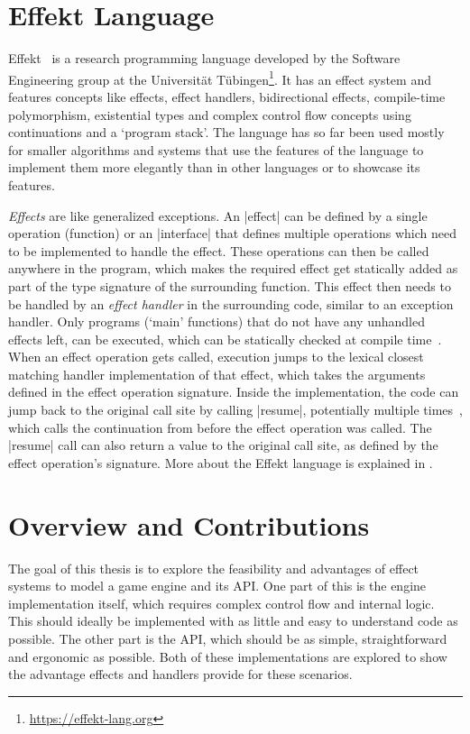 \section*{Effekt Language}

Effekt~\cite{brachthauser2020effects} is a research programming language developed by the Software Engineering group at the Universität Tübingen\footnote{\url{https://effekt-lang.org}}. It has an effect system and features concepts like effects, effect handlers, bidirectional effects, compile-time polymorphism, existential types and complex control flow concepts using continuations and a `program stack'. The language has so far been used mostly for smaller algorithms and systems that use the features of the language to implement them more elegantly than in other languages or to showcase its features.

\textit{Effects} are like generalized exceptions. An |effect| can be defined by a single operation (function) or an |interface| that defines multiple operations which need to be implemented to handle the effect. These operations can then be called anywhere in the program, which makes the required effect get statically added as part of the type signature of the surrounding function. This effect then needs to be handled by an \textit{effect handler} in the surrounding code, similar to an exception handler. Only programs (`main' functions) that do not have any unhandled effects left, can be executed, which can be statically checked at compile time~\cite{brachthauser2022effects}. When an effect operation gets called, execution jumps to the lexical closest matching handler implementation of that effect, which takes the arguments defined in the effect operation signature. Inside the implementation, the code can jump back to the original call site by calling |resume|, potentially multiple times~\cite{muhcu2025multipleresumptions}, which calls the continuation from before the effect operation was called. The |resume| call can also return a value to the original call site, as defined by the effect operation's signature. More about the Effekt language is explained in .

\section*{Overview and Contributions}

The goal of this thesis is to explore the feasibility and advantages of effect systems to model a game engine and its API. One part of this is the engine implementation itself, which requires complex control flow and internal logic. This should ideally be implemented with as little and easy to understand code as possible. The other part is the API, which should be as simple, straightforward and ergonomic as possible. Both of these implementations are explored to show the advantage effects and handlers provide for these scenarios.

